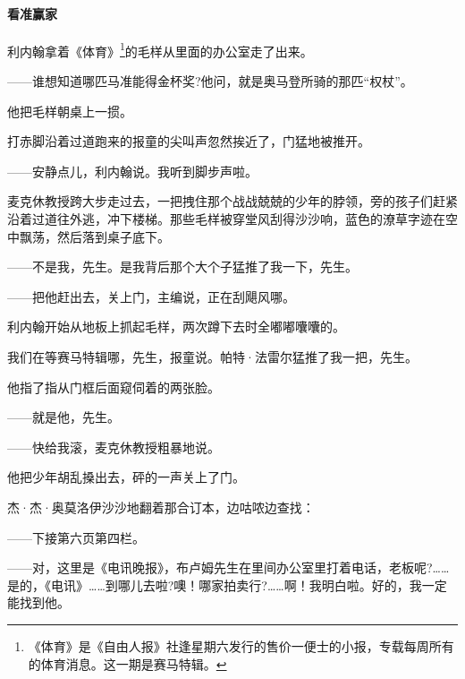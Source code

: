 \paragraph*{看准赢家}
\par 利内翰拿着《体育》\footnote{《体育》是《自由人报》社逢星期六发行的售价一便士的小报，专载每周所有的体育消息。这一期是赛马特辑。}的毛样从里面的办公室走了出来。
\par ——谁想知道哪匹马准能得金杯奖?他问，就是奥马登所骑的那匹“权杖”。
\par 他把毛样朝桌上一掼。
\par 打赤脚沿着过道跑来的报童的尖叫声忽然挨近了，门猛地被推开。
\par ——安静点儿，利内翰说。我听到脚步声啦。
\par 麦克休教授跨大步走过去，一把拽住那个战战兢兢的少年的脖领，旁的孩子们赶紧沿着过道往外逃，冲下楼梯。那些毛样被穿堂风刮得沙沙响，蓝色的潦草字迹在空中飘荡，然后落到桌子底下。
\par ——不是我，先生。是我背后那个大个子猛推了我一下，先生。
\par ——把他赶出去，关上门，主编说，正在刮飓风哪。
\par 利内翰开始从地板上抓起毛样，两次蹲下去时全嘟嘟囔囔的。
\par 我们在等赛马特辑哪，先生，报童说。帕特·法雷尔猛推了我一把，先生。
\par 他指了指从门框后面窥伺着的两张脸。
\par ——就是他，先生。
\par ——快给我滚，麦克休教授粗暴地说。
\par 他把少年胡乱搡出去，砰的一声关上了门。
\par 杰·杰·奥莫洛伊沙沙地翻着那合订本，边咕哝边查找：
\par ——下接第六页第四栏。
\par ——对，这里是《电讯晚报》，布卢姆先生在里间办公室里打着电话，老板呢?……是的，《电讯》……到哪儿去啦?噢！哪家拍卖行?……啊！我明白啦。好的，我一定能找到他。
